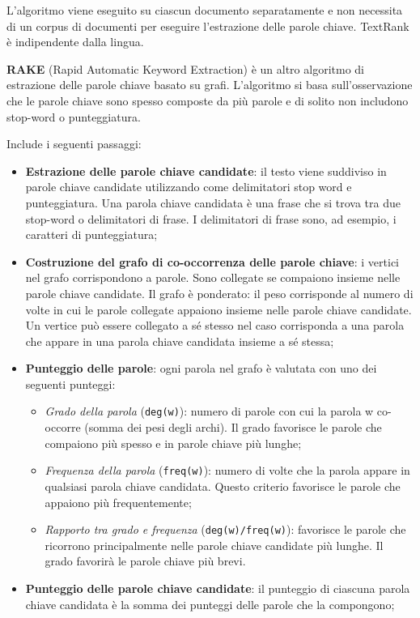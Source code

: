 L'algoritmo viene eseguito su ciascun documento separatamente e non necessita di un corpus di documenti per eseguire l'estrazione delle parole chiave. TextRank è indipendente dalla lingua.

\textbf{RAKE} (Rapid Automatic Keyword Extraction) è un altro algoritmo di estrazione delle parole chiave basato su grafi. L'algoritmo si basa sull'osservazione che le parole chiave sono spesso composte da più parole e di solito non includono stop-word o punteggiatura.

Include i seguenti passaggi:
\begin{itemize}
\item \textbf{Estrazione delle parole chiave candidate}: il testo viene suddiviso in parole chiave candidate utilizzando come delimitatori stop word e  punteggiatura. Una parola chiave candidata è una frase che si trova tra due stop-word o delimitatori di frase. I delimitatori di frase sono, ad esempio, i caratteri di punteggiatura;
\item \textbf{Costruzione del grafo di co-occorrenza delle parole chiave}: i vertici nel grafo corrispondono a parole. Sono collegate se compaiono insieme nelle parole chiave candidate. Il grafo è ponderato: il peso corrisponde al numero di volte in cui le parole collegate appaiono insieme nelle parole chiave candidate. Un vertice può essere collegato a sé stesso nel caso corrisponda a una parola che appare in una parola chiave candidata insieme a sé stessa;
\item \textbf{Punteggio delle parole}: ogni parola nel grafo è valutata con uno dei seguenti punteggi: 
\begin{itemize}
\item \textit{Grado della parola} (\texttt{deg(w)}): numero di parole con cui la parola w co-occorre (somma dei pesi degli archi). Il grado favorisce le parole che compaiono più spesso e in parole chiave più lunghe;
\item \textit{Frequenza della parola} (\texttt{freq(w)}): numero di volte che la parola appare in qualsiasi parola chiave candidata. Questo criterio favorisce le parole che appaiono più frequentemente;
\item \textit{Rapporto tra grado e frequenza} (\texttt{deg(w)/freq(w)}): favorisce le parole che ricorrono principalmente nelle parole chiave candidate più lunghe. Il grado favorirà le parole chiave più brevi.
\end{itemize}
\item \textbf{Punteggio delle parole chiave candidate}: il punteggio di ciascuna parola chiave candidata è la somma dei punteggi delle parole che la compongono;

\end{itemize}
